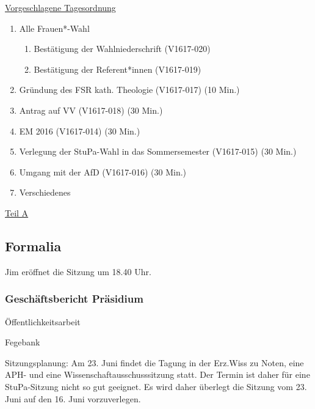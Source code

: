 \documentclass[ngerman,headheight=70pt]{scrartcl}
\begin{document}
    \newpage
    \underline{Vorgeschlagene Tagesordnung}
    \begin{enumerate}[label={\textbf{Top \theenumi}},leftmargin=*]
        \item Alle Frauen*-Wahl
            \begin{enumerate}
                \item Bestätigung der Wahlniederschrift (V1617-020)
                \item Bestätigung der Referent*innen (V1617-019)
            \end{enumerate}
        \item Gründung des FSR kath. Theologie (V1617-017) (10 Min.)
        \item Antrag auf VV (V1617-018) (30 Min.)
        \item EM 2016 (V1617-014) (30 Min.)
        \item Verlegung der StuPa-Wahl in das Sommersemester (V1617-015) (30 Min.)
        \item Umgang mit der AfD (V1617-016) (30 Min.)
        \item Verschiedenes
    \end{enumerate}

    \newpage


    {\Large \underline{Teil A}}

    \subsection{Formalia}

    Jim eröffnet die Sitzung um 18.40 Uhr.

    \subsubsection{Geschäftsbericht Präsidium}

    Öffentlichkeitsarbeit

    Fegebank

    Sitzungsplanung:
    Am 23. Juni findet die Tagung in der Erz.Wiss zu Noten, eine APH- und eine
    Wissenschaftausschusssitzung statt. Der Termin ist daher für eine StuPa-Sitzung
    nicht so gut geeignet. Es wird daher überlegt die Sitzung vom 23. Juni auf den
    16. Juni vorzuverlegen.
\end{document}
